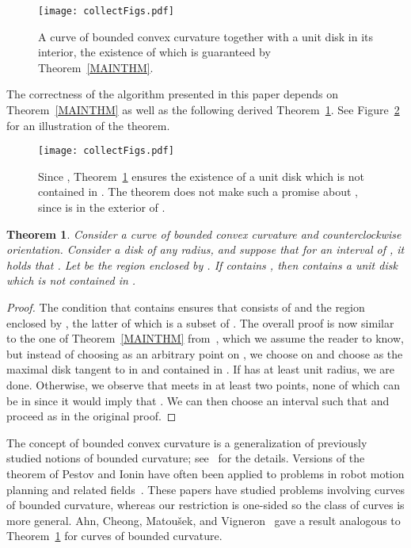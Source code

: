 \documentclass{article}
\newtheorem{theorem}{Theorem}[section]
\begin{document}
\begin{figure}
\centering
\texttt{[image: collectFigs.pdf]}
\caption{A curve  of bounded convex curvature together with a unit disk  in its interior, the existence of which is guaranteed by Theorem~\ref{MAINTHM}.}
\label{mainThmFig}
\end{figure}

The correctness of the algorithm presented in this paper depends on Theorem~\ref{MAINTHM} as well as the following derived Theorem~\ref{mainThm}.
See Figure~\ref{mainThmFig} for an illustration of the theorem.

\begin{figure}
\centering
\texttt{[image: collectFigs.pdf]}
\caption{Since , Theorem~\ref{mainThm} ensures the existence of a unit disk  which is not contained in .
The theorem does not make such a promise about , since  is in the exterior of .}
\label{mainThmFig}
\end{figure}

\begin{theorem}\label{mainThm}
Consider a curve  of bounded convex curvature and counterclockwise orientation.
Consider a disk  of any radius, and suppose that for an interval  of , it holds that .
Let  be the region enclosed by .
If  contains , then  contains a unit disk  which is not contained in . 
\end{theorem}

\begin{proof}
The condition that  contains  ensures that  consists of  and the region enclosed by , the latter of which is a subset of .
The overall proof is now similar to the one of Theorem~\ref{MAINTHM} from~\cite{aam2019disks}, which we assume the reader to know, but instead of choosing  as an arbitrary point on , we choose  on  and choose  as the maximal disk tangent to  in  and contained in .
If  has at least unit radius, we are done.
Otherwise, we observe that  meets  in at least two points, none of which can be in  since it would imply that .
We can then choose an interval  such that  and proceed as in the original proof.
\end{proof}

The concept of bounded convex curvature is a generalization of previously studied notions of bounded curvature; see~\cite{aam2019disks} for the details.
Versions of the theorem of Pestov and Ionin have often been applied to problems in robot motion planning and related fields~\cite{agarwal2002curvature,ahn2012reachability,ayala2015length,lazard2002complexity,lee2000approximation}.
These papers have studied problems involving curves of bounded curvature, whereas our restriction is one-sided so the class of curves is more general.
Ahn, Cheong, Matou{\v{s}}ek, and Vigneron~\cite[Lemma 2]{ahn2012reachability} gave a result analogous to Theorem~\ref{mainThm} for curves of bounded curvature.
\end{document}
